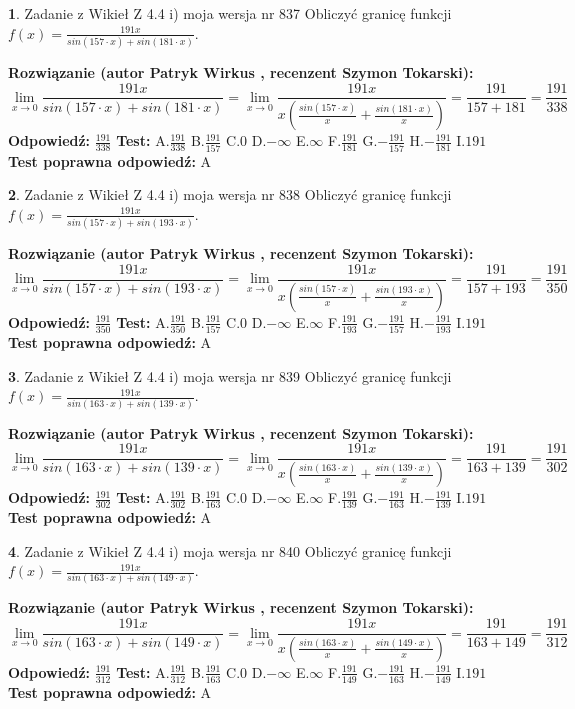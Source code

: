 \documentclass[12pt, a4paper]{article}
\theoremstyle{definition} %
\newtheorem{zad}{}
\newcommand{\zadStart}[1]{\begin{zad}#1\newline}
\newcommand{\zadStop}{\end{zad}}
\newcommand{\rozwStart}[2]{\noindent \textbf{Rozwiązanie (autor #1 , recenzent #2): }\newline}
\newcommand{\rozwStop}{\newline}
\newcommand{\odpStart}{\noindent \textbf{Odpowiedź:}\newline}
\newcommand{\odpStop}{\newline}
\newcommand{\testStart}{\noindent \textbf{Test:}\newline}
\newcommand{\testStop}{\newline}
\newcommand{\kluczStart}{\noindent \textbf{Test poprawna odpowiedź:}\newline}
\newcommand{\kluczStop}{\newline}
\begin{document}
\zadStart{Zadanie z Wikieł Z 4.4 i) moja wersja nr 837}
Obliczyć granicę funkcji $f(x)=\frac{191x}{sin(157\cdot x) +sin(181\cdot x)}$.
\zadStop
\rozwStart{Patryk Wirkus}{Szymon Tokarski}
$$\lim\limits_{x\to 0}\frac{191x}{sin(157\cdot x) +sin(181\cdot x)}=\lim\limits_{x\to 0}\frac{191x}{x(\frac{sin(157\cdot x)}{x}+\frac{sin(181\cdot x)}{x})}=\frac{191}{157+181} = \frac{191}{338}$$
\rozwStop
\odpStart
$\frac{191}{338}$
\odpStop
\testStart
A.$\frac{191}{338}$
B.$\frac{191}{157}$
C.$0$
D.$-\infty$
E.$\infty$
F.$\frac{191}{181}$
G.$-\frac{191}{157}$
H.$-\frac{191}{181}$
I.$191$
\testStop
\kluczStart
A
\kluczStop



\zadStart{Zadanie z Wikieł Z 4.4 i) moja wersja nr 838}
Obliczyć granicę funkcji $f(x)=\frac{191x}{sin(157\cdot x) +sin(193\cdot x)}$.
\zadStop
\rozwStart{Patryk Wirkus}{Szymon Tokarski}
$$\lim\limits_{x\to 0}\frac{191x}{sin(157\cdot x) +sin(193\cdot x)}=\lim\limits_{x\to 0}\frac{191x}{x(\frac{sin(157\cdot x)}{x}+\frac{sin(193\cdot x)}{x})}=\frac{191}{157+193} = \frac{191}{350}$$
\rozwStop
\odpStart
$\frac{191}{350}$
\odpStop
\testStart
A.$\frac{191}{350}$
B.$\frac{191}{157}$
C.$0$
D.$-\infty$
E.$\infty$
F.$\frac{191}{193}$
G.$-\frac{191}{157}$
H.$-\frac{191}{193}$
I.$191$
\testStop
\kluczStart
A
\kluczStop



\zadStart{Zadanie z Wikieł Z 4.4 i) moja wersja nr 839}
Obliczyć granicę funkcji $f(x)=\frac{191x}{sin(163\cdot x) +sin(139\cdot x)}$.
\zadStop
\rozwStart{Patryk Wirkus}{Szymon Tokarski}
$$\lim\limits_{x\to 0}\frac{191x}{sin(163\cdot x) +sin(139\cdot x)}=\lim\limits_{x\to 0}\frac{191x}{x(\frac{sin(163\cdot x)}{x}+\frac{sin(139\cdot x)}{x})}=\frac{191}{163+139} = \frac{191}{302}$$
\rozwStop
\odpStart
$\frac{191}{302}$
\odpStop
\testStart
A.$\frac{191}{302}$
B.$\frac{191}{163}$
C.$0$
D.$-\infty$
E.$\infty$
F.$\frac{191}{139}$
G.$-\frac{191}{163}$
H.$-\frac{191}{139}$
I.$191$
\testStop
\kluczStart
A
\kluczStop



\zadStart{Zadanie z Wikieł Z 4.4 i) moja wersja nr 840}
Obliczyć granicę funkcji $f(x)=\frac{191x}{sin(163\cdot x) +sin(149\cdot x)}$.
\zadStop
\rozwStart{Patryk Wirkus}{Szymon Tokarski}
$$\lim\limits_{x\to 0}\frac{191x}{sin(163\cdot x) +sin(149\cdot x)}=\lim\limits_{x\to 0}\frac{191x}{x(\frac{sin(163\cdot x)}{x}+\frac{sin(149\cdot x)}{x})}=\frac{191}{163+149} = \frac{191}{312}$$
\rozwStop
\odpStart
$\frac{191}{312}$
\odpStop
\testStart
A.$\frac{191}{312}$
B.$\frac{191}{163}$
C.$0$
D.$-\infty$
E.$\infty$
F.$\frac{191}{149}$
G.$-\frac{191}{163}$
H.$-\frac{191}{149}$
I.$191$
\testStop
\kluczStart
A
\kluczStop
\end{document}
